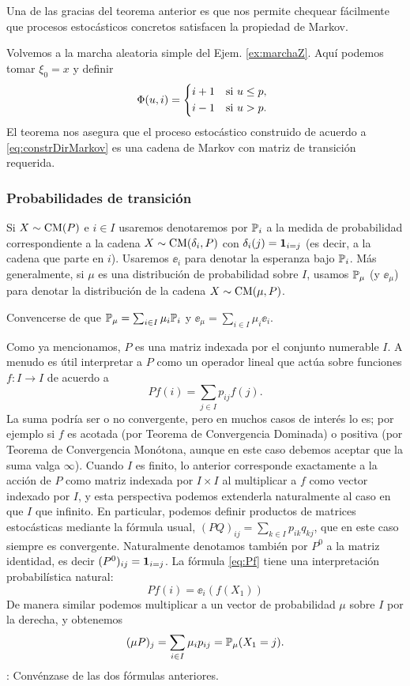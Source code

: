 Una de las gracias del teorema anterior es que nos permite chequear fácilmente que procesos estocásticos concretos satisfacen la propiedad de Markov.

\begin{ex}
Volvemos a la marcha aleatoria simple del Ejem. \ref{ex:marchaZ}.
Aquí podemos tomar $\xi_0=x$ y definir
\[\Phi(u,i)=\begin{dcases*}
i+1 & si $u\leq p$,\\
i-1 & si $u>p$.
\end{dcases*}\]
El teorema nos asegura que el proceso estocástico construido de acuerdo a \eqref{eq:constrDirMarkov} es una cadena de Markov con matriz de transición requerida.
\end{ex}

\subsubsection{Probabilidades de transición}

\begin{notation}
Si $X\sim\text{\upshape{CM}}(P)$ e $i\in I$ usaremos denotaremos por $\mathbb{P}_i$ a la medida de probabilidad correspondiente a la cadena $X\sim\text{\upshape{CM}}(\delta_i,P)$ con $\delta_i(j)=\mathbf{1}_{i=j}$ (es decir, a la cadena que parte en $i$).
Usaremos $\ee_i$ para denotar la esperanza bajo $\mathbb{P}_i$.
\lsep
Más generalmente, si $\mu$ es una distribución de probabilidad sobre $I$, usamos $\mathbb{P}_\mu$ (y $\ee_\mu$) para denotar la distribución de la cadena $X\sim\text{\upshape{CM}}(\mu,P)$.
\end{notation}

\begin{exer}
Convencerse de que $\mathbb{P}_\mu=\sum_{i\in I}\mu_i\mathbb{P}_i$ y $\ee_\mu=\sum_{i\in I}\mu_i\ee_i$.
\end{exer}

Como ya mencionamos, $P$ es una matriz indexada por el conjunto numerable $I$.
A menudo es útil interpretar a $P$ como un operador lineal que actúa sobre funciones $f\!:I\longrightarrow I$ de acuerdo a 
\begin{equation}
Pf(i)=\sum_{j\in I}p_{ij}f(j).\label{eq:Pf}
\end{equation}
La suma podría ser o no convergente, pero en muchos casos de interés lo es; por ejemplo si $f$ es acotada (por Teorema de Convergencia Dominada) o positiva (por Teorema de Convergencia Monótona, aunque en este caso debemos aceptar que la suma valga $\infty$).
Cuando $I$ es finito, lo anterior corresponde exactamente a la acción de $P$ como matriz indexada por $I\times I$ al multiplicar a $f$ como vector indexado por $I$, y esta perspectiva podemos extenderla naturalmente al caso en que $I$ que infinito.
\lsep
En particular, podemos definir productos de matrices estocásticas mediante la fórmula usual, $(PQ)_{ij}=\sum_{k\in I}p_{ik}q_{kj}$, que en este caso siempre es convergente.
Naturalmente denotamos también por $P^0$ a la matriz identidad, es decir $(P^0)_{ij}=\mathbf{1}_{i=j}$.
\lsep
La fórmula \eqref{eq:Pf} tiene una interpretación probabilística natural:
\[Pf(i)=\ee_{i}(f(X_1))\]
De manera similar podemos multiplicar a un vector de probabilidad $\mu$ sobre $I$ por la derecha, y obtenemos
\[(\mu P)_j=\sum_{i\in I}\mu_ip_{ij}=\mathbb{P}_\mu(X_1=j).\]
\uexer: Convénzase de las dos fórmulas anteriores.

